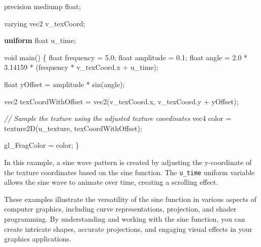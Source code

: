 \documentclass[
]{article}
\newenvironment{Shaded}{}{}
\newcommand{\BuiltInTok}[1]{#1}
\newcommand{\CommentTok}[1]{\textcolor[rgb]{0.38,0.63,0.69}{\textit{#1}}}
\newcommand{\DataTypeTok}[1]{\textcolor[rgb]{0.56,0.13,0.00}{#1}}
\newcommand{\FloatTok}[1]{\textcolor[rgb]{0.25,0.63,0.44}{#1}}
\newcommand{\FunctionTok}[1]{\textcolor[rgb]{0.02,0.16,0.49}{#1}}
\newcommand{\KeywordTok}[1]{\textcolor[rgb]{0.00,0.44,0.13}{\textbf{#1}}}
\newcommand{\NormalTok}[1]{#1}
\newcommand{\OperatorTok}[1]{\textcolor[rgb]{0.40,0.40,0.40}{#1}}
\newcommand{\VariableTok}[1]{\textcolor[rgb]{0.10,0.09,0.49}{#1}}
\begin{document}
\begin{Shaded}
\begin{Highlighting}[]
\DataTypeTok{precision} \DataTypeTok{mediump} \DataTypeTok{float}\OperatorTok{;}

\DataTypeTok{varying} \DataTypeTok{vec2}\NormalTok{ v\_texCoord}\OperatorTok{;}

\KeywordTok{uniform} \DataTypeTok{float}\NormalTok{ u\_time}\OperatorTok{;}

\DataTypeTok{void} \FunctionTok{main}\OperatorTok{()} \OperatorTok{\{}
    \DataTypeTok{float}\NormalTok{ frequency }\OperatorTok{=} \FloatTok{5.0}\OperatorTok{;}
    \DataTypeTok{float}\NormalTok{ amplitude }\OperatorTok{=} \FloatTok{0.1}\OperatorTok{;}
    \DataTypeTok{float}\NormalTok{ angle }\OperatorTok{=} \FloatTok{2.0} \OperatorTok{*} \FloatTok{3.14159} \OperatorTok{*} \OperatorTok{(}\NormalTok{frequency }\OperatorTok{*}\NormalTok{ v\_texCoord}\OperatorTok{.}\FunctionTok{x} \OperatorTok{+}\NormalTok{ u\_time}\OperatorTok{);}

    \DataTypeTok{float}\NormalTok{ yOffset }\OperatorTok{=}\NormalTok{ amplitude }\OperatorTok{*} \BuiltInTok{sin}\OperatorTok{(}\NormalTok{angle}\OperatorTok{);}

    \DataTypeTok{vec2}\NormalTok{ texCoordWithOffset }\OperatorTok{=} \DataTypeTok{vec2}\OperatorTok{(}\NormalTok{v\_texCoord}\OperatorTok{.}\FunctionTok{x}\OperatorTok{,}\NormalTok{ v\_texCoord}\OperatorTok{.}\FunctionTok{y} \OperatorTok{+}\NormalTok{ yOffset}\OperatorTok{);}

    \CommentTok{// Sample the texture using the adjusted texture coordinates}
    \DataTypeTok{vec4}\NormalTok{ color }\OperatorTok{=} \DataTypeTok{texture2D}\OperatorTok{(}\NormalTok{u\_texture}\OperatorTok{,}\NormalTok{ texCoordWithOffset}\OperatorTok{);}

    \VariableTok{gl\_FragColor} \OperatorTok{=}\NormalTok{ color}\OperatorTok{;}
\OperatorTok{\}}
\end{Highlighting}
\end{Shaded}

In this example, a sine wave pattern is created by adjusting the
y-coordinate of the texture coordinates based on the sine function. The
\texttt{u\_time} uniform variable allows the sine wave to animate over
time, creating a scrolling effect.

These examples illustrate the versatility of the sine function in
various aspects of computer graphics, including curve representations,
projection, and shader programming. By understanding and working with
the sine function, you can create intricate shapes, accurate
projections, and engaging visual effects in your graphics applications.
\end{document}
